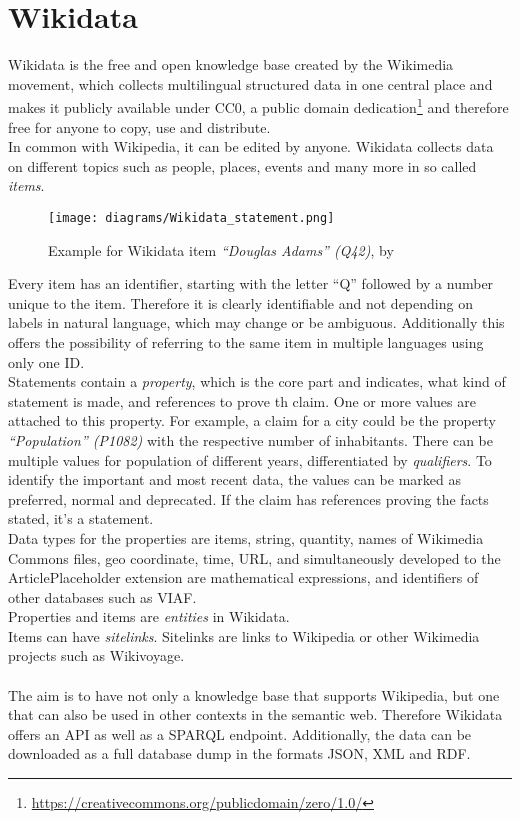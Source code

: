 \section{Wikidata}

Wikidata is the free and open knowledge base created by the Wikimedia movement, which collects multilingual structured data in one central place and makes it publicly available under CC0, a public domain dedication\footnote{\href{https://creativecommons.org/publicdomain/zero/1.0/}{https://creativecommons.org/publicdomain/zero/1.0/}} and therefore free for anyone to copy, use and distribute. \\
In common with Wikipedia, it can be edited by anyone. Wikidata collects data on different topics such as people, places, events and many more in so called \textit{items}.
\begin{figure}[H]
	\centering
	\texttt{[image: diagrams/Wikidata\_statement.png]}
	\caption{Example for Wikidata item \textit{``Douglas Adams'' (Q42)}, by \citet{kritschmar}}
	\label{diagramWikidataStatement}
\end{figure}
Every item has an identifier, starting with the letter ``Q'' followed by a number unique to the item. Therefore it is clearly identifiable and not depending on labels in natural language, which may change or be ambiguous. Additionally this offers the possibility of referring to the same item in multiple languages using only one ID. \\
Statements contain a \textit{property}, which is the core part and indicates, what kind of statement is made, and references to prove th claim. One or more values are attached to this property. For example, a claim for a city could be the property \textit{``Population'' (P1082)} with the respective number of inhabitants. There can be multiple values for population of different years, differentiated by \textit{qualifiers}. To identify the important and most recent data, the values can be marked as preferred, normal and deprecated. If the claim has references proving the facts stated, it's a statement. \\
Data types for the properties are items, string, quantity, names of Wikimedia Commons files, geo coordinate, time, URL,  and simultaneously developed to the ArticlePlaceholder extension are mathematical expressions, and identifiers of other databases such as VIAF. \\
Properties and items are \textit{entities} in Wikidata. \\
Items can have \textit{sitelinks}. Sitelinks are links to Wikipedia or other Wikimedia projects such as Wikivoyage. \\
\\
The aim is to have not only a knowledge base that supports Wikipedia, but one that can also be used in other contexts in the semantic web. Therefore Wikidata offers an API as well as a SPARQL endpoint. Additionally, the data can be downloaded as a full database dump in the formats JSON, XML and RDF. 